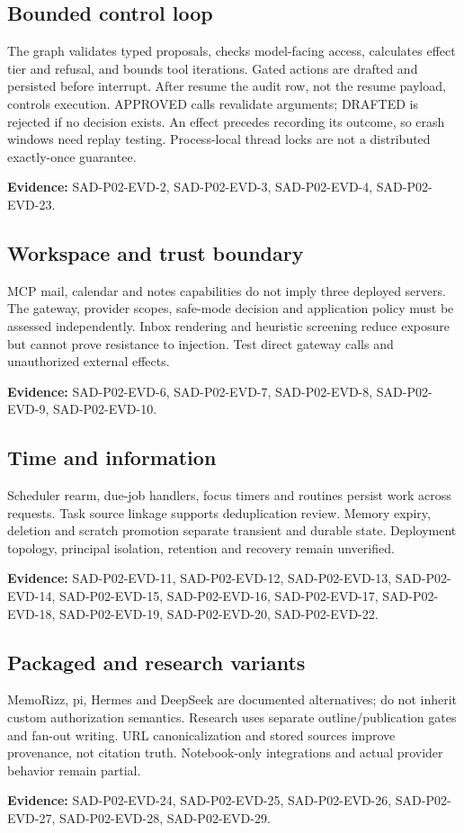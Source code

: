 \documentclass[10pt,letterpaper]{article}
\begin{document}
\subsection{Bounded control loop}
The graph validates typed proposals, checks model-facing access, calculates effect tier and refusal, and bounds tool iterations. Gated actions are drafted and persisted before interrupt. After resume the audit row, not the resume payload, controls execution. APPROVED calls revalidate arguments; DRAFTED is rejected if no decision exists. An effect precedes recording its outcome, so crash windows need replay testing. Process-local thread locks are not a distributed exactly-once guarantee.\par\textbf{Evidence:} SAD-P02-EVD-2, SAD-P02-EVD-3, SAD-P02-EVD-4, SAD-P02-EVD-23.\par

\subsection{Workspace and trust boundary}
MCP mail, calendar and notes capabilities do not imply three deployed servers. The gateway, provider scopes, safe-mode decision and application policy must be assessed independently. Inbox rendering and heuristic screening reduce exposure but cannot prove resistance to injection. Test direct gateway calls and unauthorized external effects.\par\textbf{Evidence:} SAD-P02-EVD-6, SAD-P02-EVD-7, SAD-P02-EVD-8, SAD-P02-EVD-9, SAD-P02-EVD-10.\par

\subsection{Time and information}
Scheduler rearm, due-job handlers, focus timers and routines persist work across requests. Task source linkage supports deduplication review. Memory expiry, deletion and scratch promotion separate transient and durable state. Deployment topology, principal isolation, retention and recovery remain unverified.\par\textbf{Evidence:} SAD-P02-EVD-11, SAD-P02-EVD-12, SAD-P02-EVD-13, SAD-P02-EVD-14, SAD-P02-EVD-15, SAD-P02-EVD-16, SAD-P02-EVD-17, SAD-P02-EVD-18, SAD-P02-EVD-19, SAD-P02-EVD-20, SAD-P02-EVD-22.\par

\subsection{Packaged and research variants}
MemoRizz, pi, Hermes and DeepSeek are documented alternatives; do not inherit custom authorization semantics. Research uses separate outline/publication gates and fan-out writing. URL canonicalization and stored sources improve provenance, not citation truth. Notebook-only integrations and actual provider behavior remain partial.\par\textbf{Evidence:} SAD-P02-EVD-24, SAD-P02-EVD-25, SAD-P02-EVD-26, SAD-P02-EVD-27, SAD-P02-EVD-28, SAD-P02-EVD-29.\par
\end{document}
